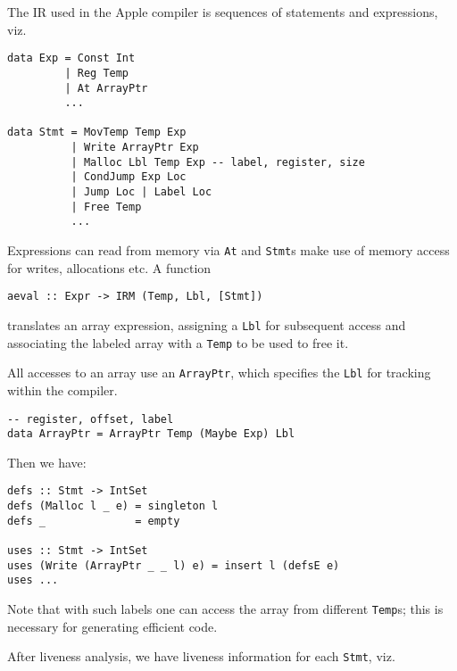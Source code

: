 \documentclass[sigplan,screen,anonymous]{acmart}
\begin{document}
The IR used in the Apple compiler is sequences of statements and expressions, viz.

\begin{verbatim}
data Exp = Const Int
         | Reg Temp
         | At ArrayPtr
         ...

data Stmt = MovTemp Temp Exp
          | Write ArrayPtr Exp
          | Malloc Lbl Temp Exp -- label, register, size
          | CondJump Exp Loc
          | Jump Loc | Label Loc
          | Free Temp
          ...
\end{verbatim}

Expressions can read from memory via {\tt At} and {\tt Stmt}s make use of memory access for writes, allocations etc. A function

\begin{verbatim}
aeval :: Expr -> IRM (Temp, Lbl, [Stmt])
\end{verbatim}
translates an array expression, assigning a {\tt Lbl} for subsequent access and associating the labeled array with a {\tt Temp} to be used to free it.

All accesses to an array use an {\tt ArrayPtr}, which specifies the {\tt Lbl} for tracking within the compiler.

\begin{verbatim}
-- register, offset, label
data ArrayPtr = ArrayPtr Temp (Maybe Exp) Lbl
\end{verbatim}

Then we have:

\begin{verbatim}
defs :: Stmt -> IntSet
defs (Malloc l _ e) = singleton l
defs _              = empty

uses :: Stmt -> IntSet
uses (Write (ArrayPtr _ _ l) e) = insert l (defsE e)
uses ...
\end{verbatim}


Note that with such labels one can access the array from different {\tt Temp}s; this is necessary for generating efficient code.


After liveness analysis, we have liveness information for each {\tt Stmt}, viz.

\end{document}
